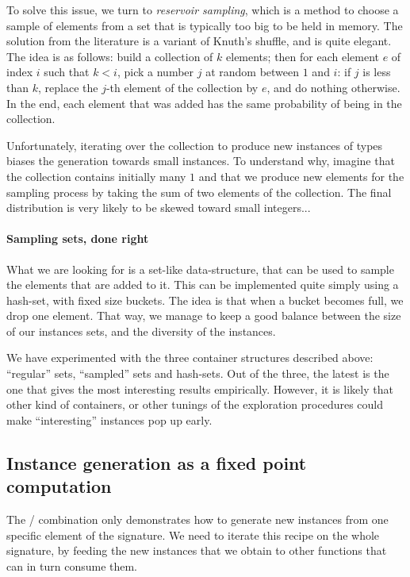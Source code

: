 To solve this issue, we turn to \emph{reservoir sampling}, which is a
method to choose a sample of elements from a set that is typically too
big to be held in memory.
%
The solution from the literature is a variant of Knuth's shuffle, and
is quite elegant. The idea is as follows: build a collection of $k$
elements; then for each element $e$ of index $i$ such that $k < i$,
pick a number $j$ at random between $1$ and $i$: if $j$ is less than
$k$, replace the $j$-th element of the collection by $e$, and do
nothing otherwise. In the end, each element that was added has the same
probability of being in the collection.

Unfortunately, iterating over the collection to produce new instances
of types biases the generation towards small instances. To understand
why, imagine that the collection contains initially many $1$ and that
we produce new elements for the sampling process by taking the sum of
two elements of the collection. The final distribution is very likely
to be skewed toward small integers...

\paragraph{Sampling sets, done right} What we are looking for is a
set-like data-structure, that can be used to sample the elements that
are added to it.
%
This can be implemented quite simply using a hash-set, with fixed size
buckets. The idea is that when a bucket becomes full, we drop one
element. That way, we manage to keep a good balance between the size
of our instances sets, and the diversity of the instances.

We have experimented with the three container structures described
above: ``regular'' sets, ``sampled'' sets and hash-sets. Out of the
three, the latest is the one that gives the most interesting results
empirically.
%
However, it is likely that other kind of containers, or other tunings
of the exploration procedures could make ``interesting'' instances pop
up early.

\subsection{Instance generation as a fixed point computation}

The / combination only demonstrates how to generate
new instances from one specific element of the signature. We need to iterate
this recipe on the whole signature, by feeding the new instances that we
obtain to other functions that can in turn consume them.

